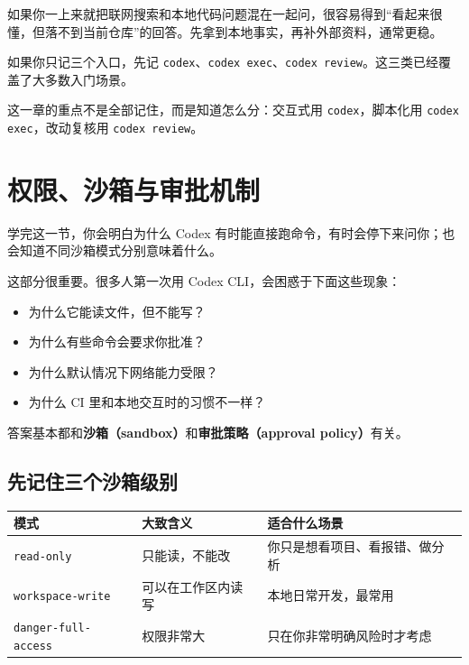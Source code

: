 \documentclass[UTF8,a4paper,12pt]{ctexart}
\begin{document}
\begin{warnbox}
如果你一上来就把联网搜索和本地代码问题混在一起问，很容易得到“看起来很懂，但落不到当前仓库”的回答。先拿到本地事实，再补外部资料，通常更稳。
\end{warnbox}

\begin{tipbox}
如果你只记三个入口，先记 \texttt{codex}、\texttt{codex exec}、\texttt{codex review}。这三类已经覆盖了大多数入门场景。
\end{tipbox}

\begin{sumbox}
这一章的重点不是全部记住，而是知道怎么分：交互式用 \texttt{codex}，脚本化用 \texttt{codex exec}，改动复核用 \texttt{codex review}。
\end{sumbox}

\section{权限、沙箱与审批机制}

\begin{learnbox}
学完这一节，你会明白为什么 Codex 有时能直接跑命令，有时会停下来问你；也会知道不同沙箱模式分别意味着什么。
\end{learnbox}

这部分很重要。很多人第一次用 Codex CLI，会困惑于下面这些现象：
\begin{itemize}
  \item 为什么它能读文件，但不能写？
  \item 为什么有些命令会要求你批准？
  \item 为什么默认情况下网络能力受限？
  \item 为什么 CI 里和本地交互时的习惯不一样？
\end{itemize}

答案基本都和\textbf{沙箱（sandbox）}和\textbf{审批策略（approval policy）}有关。

\subsection{先记住三个沙箱级别}

\begin{longtable}{p{} p{} p{}}
\toprule
模式 & 大致含义 & 适合什么场景 \\
\midrule
\endhead
\texttt{read-only} & 只能读，不能改 & 你只是想看项目、看报错、做分析 \\
\texttt{workspace-write} & 可以在工作区内读写 & 本地日常开发，最常用 \\
\texttt{danger-full-access} & 权限非常大 & 只在你非常明确风险时才考虑 \\
\bottomrule
\end{longtable}
\end{document}

